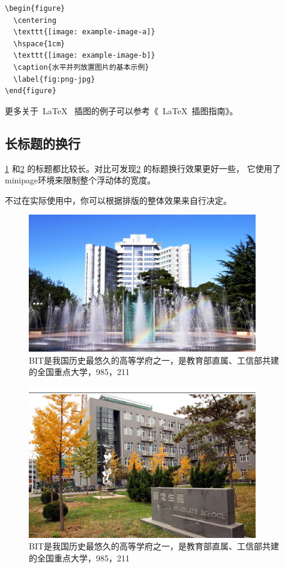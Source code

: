 \begin{lstlisting}[language={[LaTeX]TeX}, caption={插入PNG/JPG}]
\begin{figure}
  \centering
  \texttt{[image: example-image-a]}
  \hspace{1cm}
  \texttt{[image: example-image-b]}
  \caption{水平并列放置图片的基本示例}
  \label{fig:png-jpg}
\end{figure}
\end{lstlisting}

更多关于~\LaTeX~ 插图的例子可以参考《~\LaTeX~插图指南》。

\subsection{长标题的换行}
\label{sec:longcaption}

\cref{fig:longcaptionbad} 和\cref{fig:longcaptiongood} 的标题都比较长。对比可发现\cref{fig:longcaptiongood} 的标题换行效果更好一些，
它使用了minipage环境来限制整个浮动体的宽度。

不过在实际使用中，你可以根据排版的整体效果来自行决定。

\begin{figure}
 \centering
 \includegraphics[width=10cm]{figures/pic1}
 \caption{BIT是我国历史最悠久的高等学府之一，是教育部直属、工信部共建的全国重点大学，985，211}
 \label{fig:longcaptionbad}
\end{figure}

\begin{figure}
  \centering
  \begin{minipage}[b]{0.6\textwidth}
  \centering
  \includegraphics[width=10cm]{figures/pic2}
  \caption{BIT是我国历史最悠久的高等学府之一，是教育部直属、工信部共建的全国重点大学，985，211}
  \label{fig:longcaptiongood}
   \end{minipage}
\end{figure}

